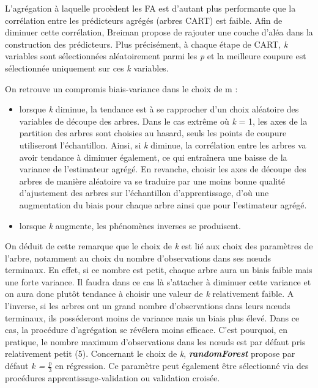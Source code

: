 	L'agrégation à laquelle procèdent les FA est d’autant plus performante que la corrélation entre les prédicteurs agrégés  (arbres CART) est faible. Afin de diminuer cette corrélation, Breiman\cite{BREI01} propose de rajouter une couche d’aléa dans la construction des
		prédicteurs. Plus précisément, à chaque étape de CART, \textit{k} variables sont sélectionnées aléatoirement parmi les \textit{p} et la meilleure coupure est sélectionnée uniquement sur ces \textit{k} variables. \par
		On retrouve un compromis biais-variance dans le choix de m :
		\begin{itemize}
		\item lorsque \textit{k} diminue, la tendance est à se rapprocher d’un choix aléatoire des variables
		de découpe des arbres. Dans le cas extrême où \textit{k} = 1, les axes de la partition des arbres
		sont choisies au hasard, seuls les points de coupure utiliseront l’échantillon. Ainsi, si \textit{k}
		diminue, la corrélation entre les arbres va avoir tendance à diminuer également, ce qui
		entraînera une baisse de la variance de l’estimateur agrégé. En revanche, choisir les axes
		de découpe des arbres de manière aléatoire va se traduire par une moins bonne
		qualité d’ajustement des arbres sur l’échantillon d’apprentissage, d’où une augmentation
		du biais pour chaque arbre ainsi que pour l’estimateur agrégé.
		\item lorsque \textit{k} augmente, les phénomènes inverses se produisent.
		\end{itemize}
		On déduit de cette remarque que le choix de \textit{k} est lié aux choix des paramètres de l’arbre,
		notamment au choix du nombre d’observations dans ses nœuds terminaux. En effet, si ce
		nombre est petit, chaque arbre aura un biais faible mais une forte variance. Il faudra dans ce cas là s’attacher à diminuer cette variance et on aura donc plutôt tendance à choisir une
		valeur de \textit{k} relativement faible. A l’inverse, si les arbres ont un grand nombre d’observations
		dans leurs nœuds terminaux, ils posséderont moins de variance mais un biais plus élevé. Dans
		ce cas, la procédure d’agrégation se révélera moins efficace. C’est pourquoi, en pratique, le
		nombre maximum d’observations dans les nœuds est par défaut pris relativement petit (5). Concernant le choix de \textit{k}, \textit{\textbf{randomForest}} propose par
		défaut \textit{k = $\frac{p}{3}$} en régression. Ce paramètre peut également
		être sélectionné via des procédures apprentissage-validation ou validation croisée.
		
